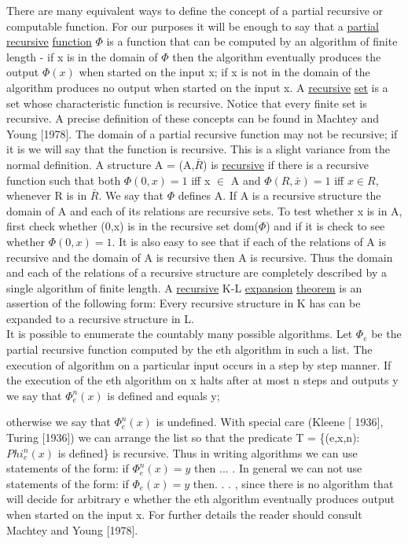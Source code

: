 \documentclass[twoside]{article}
\begin{document}
There are many equivalent ways to define the concept of a partial recursive or computable function.    
For our purposes it will be enough to say that a \underline{partial} \underline{recursive} \underline{function}  $\Phi$    is a function that can be computed by an algorithm of finite length - if   x   is in the domain of $\Phi$ then the algorithm eventually produces the output $\Phi(x)$ when started on the input   x; if   x is not in the domain of     the algorithm produces no output when started on the input   x.   
A \underline{recursive} \underline{set} is a set whose characteristic function is recursive. 
Notice that every finite set is recursive. A precise definition of these concepts can be found in Machtey and Young [1978].   
The domain of a partial recursive function may not be recursive; if it is we will say that the function is recursive.   
This is a slight variance from the normal definition. 
A structure   A   = (A,$\bar{R}$)    is \underline{recursive} if there is a recursive function  such that both $\Phi(0,x) = 1$   iff   x $\in$ A   and $\Phi(R, \bar{x}) = 1$   iff   $x\in R$, whenever R is in $\bar{R}$. We say that $\Phi$   defines   A.   
If   A   is a recursive structure the domain of   A     and each of its relations are recursive sets.   
To test whether x   is in   A, first check whether   (0,x)   is in the recursive set   dom($\Phi$) and if it is check to see whether   $\Phi(0,x) = 1$.
It is also easy to see that if each of the relations of   A   is recursive and the domain of   A   is recursive then   A   is recursive.   
Thus the domain and each of the relations of a recursive structure are completely described by a single algorithm of finite length. 
A \underline{recursive} K-L \underline{expansion} \underline{theorem} is an assertion of the following form: Every recursive structure in K has can be expanded to a recursive structure in L.\\ 
\indent It is possible to enumerate the countably many possible algorithms. 
Let $\Phi_e$   be the partial recursive function computed by the eth algorithm in such a list.   
The execution of      algorithm on a particular input occurs in a step by step manner.    
If the execution of the   eth   algorithm   on   x   halts after at most   n   steps and outputs   y   we say that   $\Phi_e^n(x)$   is defined and equals y;
\newpage
%
%


\noindent otherwise we say that  $\Phi_e^n(x)$    is undefined.   With special care (Kleene [ 1936], Turing [1936]) we can arrange the list so that the predicate   T = \{(e,x,n): $Phi_e^n(x)$   is defined\} is recursive.    
Thus in writing algorithms we can use statements of the form: if $\Phi_e^n(x) = y$ then ...  .    In general we can not use statements of the form:  if    $\Phi_e(x) = y$ then. . . , since there is no algorithm that will decide for arbitrary   e   whether the   eth   algorithm eventually produces output when started on the input   x.    
For further details the reader should consult Machtey and Young [1978].\\
\end{document}
